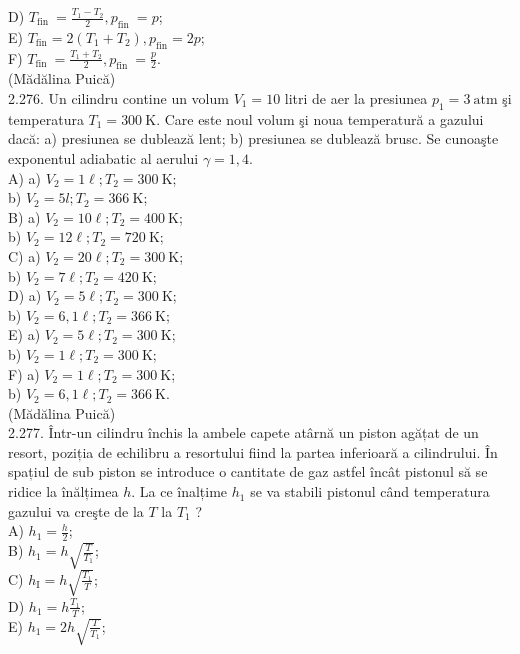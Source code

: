 \documentclass[10pt]{article}
\begin{document}
D) $T_{\text {fin }}=\frac{T_{1}-T_{2}}{2}, p_{\text {fin }}=p$;\\
E) $T_{\mathrm{fin}}=2\left(T_{1}+T_{2}\right), p_{\mathrm{fin}}=2 p$;\\
F) $T_{\text {fin }}=\frac{T_{1}+T_{2}}{2}, p_{\text {fin }}=\frac{p}{2}$.\\
(Mădălina Puică)\\
2.276. Un cilindru contine un volum $V_{1}=10$ litri de aer la presiunea $p_{1}=3 \mathrm{~atm}$ şi temperatura $T_{1}=300 \mathrm{~K}$. Care este noul volum şi noua temperatură a gazului dacă: a) presiunea se dublează lent; b) presiunea se dublează brusc. Se cunoaşte exponentul adiabatic al aerului $\gamma=1,4$.\\
A) a) $V_{2}=1 \ell ; T_{2}=300 \mathrm{~K}$;\\
b) $V_{2}=5 l ; T_{2}=366 \mathrm{~K}$;\\
B) a) $V_{2}=10 \ell ; T_{2}=400 \mathrm{~K}$;\\
b) $V_{2}=12 \ell ; T_{2}=720 \mathrm{~K}$;\\
C) a) $V_{2}=20 \ell ; T_{2}=300 \mathrm{~K}$;\\
b) $V_{2}=7 \ell ; T_{2}=420 \mathrm{~K}$;\\
D) a) $V_{2}=5 \ell ; T_{2}=300 \mathrm{~K}$;\\
b) $V_{2}=6,1 \ell ; T_{2}=366 \mathrm{~K}$;\\
E) a) $V_{2}=5 \ell ; T_{2}=300 \mathrm{~K}$;\\
b) $V_{2}=1 \ell ; T_{2}=300 \mathrm{~K}$;\\
F) a) $V_{2}=1 \ell ; T_{2}=300 \mathrm{~K}$;\\
b) $V_{2}=6,1 \ell ; T_{2}=366 \mathrm{~K}$.\\
(Mădălina Puică)\\
2.277. Într-un cilindru închis la ambele capete atârnă un piston agățat de un resort, poziția de echilibru a resortului fiind la partea inferioară a cilindrului. În spațiul de sub piston se introduce o cantitate de gaz astfel încât pistonul să se ridice la înălțimea $h$. La ce înalțime $h_{1}$ se va stabili pistonul când temperatura gazului va creşte de la $T$ la $T_{1}$ ?\\
A) $h_{1}=\frac{h}{2}$;\\
B) $h_{1}=h \sqrt{\frac{T}{T_{1}}}$;\\
C) $h_{\mathrm{I}}=h \sqrt{\frac{T_{1}}{T}}$;\\
D) $h_{1}=h \frac{T_{1}}{T}$;\\
E) $h_{1}=2 h \sqrt{\frac{T}{T_{1}}}$;\\
\end{document}

